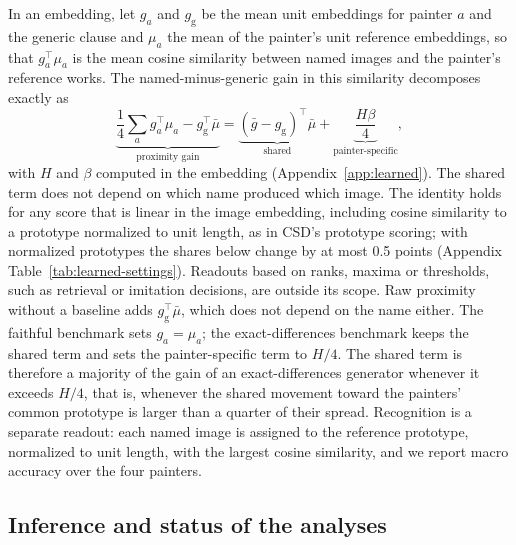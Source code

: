 \documentclass[10pt]{article}
\begin{document}
In an embedding, let $g_a$ and $g_{\mathrm{g}}$ be the mean unit embeddings for painter $a$ and the
generic clause and $\mu_a$ the mean of the painter's unit reference embeddings, so that
$g_a^\top\mu_a$ is the mean cosine similarity between named images and the painter's reference
works. The named-minus-generic gain in this similarity decomposes exactly as
\begin{equation}
\underbrace{\frac14\sum_a g_a^\top\mu_a-g_{\mathrm{g}}^\top\bar\mu}_{\text{proximity gain}}
=\underbrace{(\bar g-g_{\mathrm{g}})^\top\bar\mu}_{\text{shared}}
+\underbrace{\frac{H\beta}{4}}_{\text{painter-specific}},
\label{eq:prototype-gain}
\end{equation}
with $H$ and $\beta$ computed in the embedding (Appendix~\ref{app:learned}). The shared term does
not depend on which name produced which image. The identity holds for any score that is linear in
the image embedding, including cosine similarity to a prototype normalized to unit length, as in
CSD's prototype scoring; with normalized prototypes the shares below change by at most 0.5 points
(Appendix Table~\ref{tab:learned-settings}). Readouts based on ranks, maxima or thresholds, such as
retrieval or imitation decisions, are outside its scope. Raw proximity without a baseline adds
$g_{\mathrm{g}}^\top\bar\mu$, which does not depend on the name either. The faithful benchmark sets
$g_a=\mu_a$; the exact-differences benchmark keeps the shared term and sets the painter-specific
term to $H/4$. The shared term is therefore a majority of the gain of an exact-differences
generator whenever it exceeds $H/4$, that is, whenever the shared movement toward the painters'
common prototype is larger than a quarter of their spread. Recognition is a separate readout: each
named image is assigned to the reference prototype, normalized to unit length, with the largest
cosine similarity, and we report macro accuracy over the four painters.

\subsection{Inference and status of the analyses}\label{sec:inference}
\end{document}
